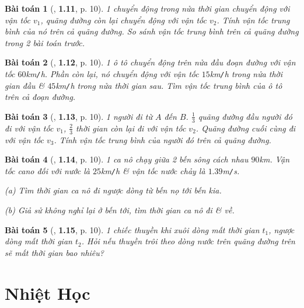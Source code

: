 \documentclass{article}
\numberwithin{equation}{section}
\newtheorem{baitoan}{Bài toán}[section]
\begin{document}
\begin{baitoan}[\cite{Van2022}, \textbf{1.11}, p. 10]
	1 chuyển động trong nửa thời gian chuyển động với vận tốc $v_1$, quãng đường còn lại chuyển động với vận tốc $v_2$. Tính vận tốc trung bình của nó trên cả quãng đường. So sánh vận tốc trung bình trên cả quãng đường trong 2 bài toán trước.
\end{baitoan}

\begin{baitoan}[\cite{Van2022}, \textbf{1.12}, p. 10]
	1 ô tô chuyển động trên nửa đầu đoạn đường với vận tốc $60$\emph{km\texttt{/}h}. Phần còn lại, nó chuyển động với vận tốc $15$\emph{km\texttt{/}h} trong nửa thời gian đầu \& $45$\emph{km\texttt{/}h} trong nửa thời gian sau. Tìm vận tốc trung bình của ô tô trên cả đoạn đường.
\end{baitoan}

\begin{baitoan}[\cite{Van2022}, \textbf{1.13}, p. 10]
	1 người đi từ $A$ đến $B$. $\frac{1}{3}$ quãng đường đầu người đó đi với vận tốc $v_1$, $\frac{2}{3}$ thời gian còn lại đi với vận tốc $v_2$. Quãng đường cuối cùng đi với vận tốc $v_3$. Tính vận tốc trung bình của người đó trên cả quãng đường.
\end{baitoan}

\begin{baitoan}[\cite{Van2022}, \textbf{1.14}, p. 10]
	1 ca nô chạy giữa 2 bến sông cách nhau $90$\emph{km}. Vận tốc cano đối với nước là $25$\emph{km\texttt{/}h} \& vận tốc nước chảy là $1.39$\emph{m\texttt{/}s}.
	\begin{enumerate*}
		\item[(a)] Tìm thời gian ca nô đi ngược dòng từ bến nọ tới bến kia.
		\item[(b)] Giả sử không nghỉ lại ở bến tới, tìm thời gian ca nô đi \& về.
	\end{enumerate*}
\end{baitoan}

\begin{baitoan}[\cite{Van2022}, \textbf{1.15}, p. 10]
	1 chiếc thuyền khi xuôi dòng mất thời gian $t_1$, ngược dòng mất thời gian $t_2$. Hỏi nếu thuyền trôi theo dòng nước trên quãng đường trên sẽ mất thời gian bao nhiêu?
\end{baitoan}


\newpage
\section{Nhiệt Học}
\end{document}
